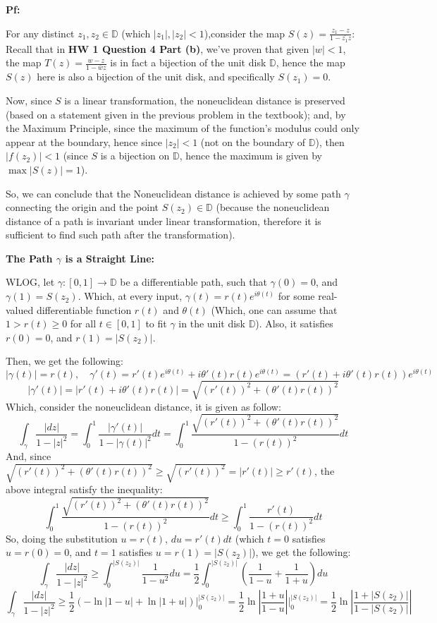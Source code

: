 \documentclass{article}
\begin{document}
\textbf{Pf:}

For any distinct $z_1,z_2\in\mathbb{D}$ (which $|z_1|,|z_2|<1$),consider the map $S(z)=\frac{z_1-z}{1-\bar{z_1}z}$:
Recall that in \textbf{HW 1 Question 4 Part (b)}, we've proven that given $|w|<1$, the map $T(z)=\frac{w-z}{1-\bar{w}z}$ is in fact a bijection of the unit disk $\mathbb{D}$,
hence the map $S(z)$ here is also a bijection of the unit disk, and specifically $S(z_1)=0$.

\hfill

Now, since $S$ is a linear transformation, the noneuclidean distance is preserved (based on a statement given in the previous problem in the textbook);
and, by the Maximum Principle, since the maximum of the function's modulus could only appear at the boundary, hence since $|z_2|<1$ (not on the boundary of $\mathbb{D}$),
then $|f(z_2)|<1$ (since $S$ is a bijection on $\mathbb{D}$, hence the maximum is given by $\max|S(z)|=1$).

So, we can conclude that the Noneuclidean distance is achieved by some path $\gamma$ connecting the origin and the point $S(z_2)\in\mathbb{D}$ (because the noneuclidean distance of a path is invariant under linear transformation, 
therefore it is sufficient to find such path after the transformation).

\hfill

\textbf{The Path $\gamma$ is a Straight Line:}

WLOG, let $\gamma:[0,1]\rightarrow\mathbb{D}$ be a differentiable path, such that $\gamma(0)=0$, and $\gamma(1)=S(z_2)$. 
Which, at every input, $\gamma(t)=r(t)e^{i\theta(t)}$ for some real-valued differentiable function $r(t)$ and $\theta(t)$ (Which, one can assume that $1>r(t)\geq 0$ for all $t\in [0,1]$ to fit $\gamma$ in the unit disk $\mathbb{D}$).
Also, it satisfies $r(0)=0$, and $r(1)=|S(z_2)|$.

Then, we get the following:
$$|\gamma(t)| = r(t),\quad \gamma'(t) = r'(t)e^{i\theta(t)}  + i\theta'(t)r(t)e^{i\theta(t)}=(r'(t)+i\theta'(t)r(t))e^{i\theta(t)}$$
$$|\gamma'(t)| = |r'(t)+i\theta'(t)r(t)| = \sqrt{(r'(t))^2+(\theta'(t)r(t))^2}$$
Which, consider the noneuclidean distance, it is given as follow:
$$\int_{\gamma}\frac{|dz|}{1-|z|^2} = \int_{0}^{1}\frac{|\gamma'(t)|}{1-|\gamma(t)|^2}dt = \int_{0}^{1}\frac{\sqrt{(r'(t))^2+(\theta'(t)r(t))^2}}{1-(r(t))^2}dt$$
And, since $\sqrt{(r'(t))^2+(\theta'(t)r(t))^2}\geq \sqrt{(r'(t))^2} = |r'(t)|\geq r'(t)$, the above integral satisfy the inequality:
$$\int_{0}^{1}\frac{\sqrt{(r'(t))^2+(\theta'(t)r(t))^2}}{1-(r(t))^2}dt \geq \int_{0}^{1}\frac{r'(t)}{1-(r(t))^2}dt$$
So, doing the substitution $u=r(t)$, $du = r'(t)dt$ (which $t=0$ satisfies $u=r(0)=0$, and $t=1$ satisfies $u=r(1)=|S(z_2)|$), we get the following:
$$\int_{\gamma}\frac{|dz|}{1-|z|^2}\geq \int_{0}^{|S(z_2)|}\frac{1}{1-u^2}du = \frac{1}{2}\int_{0}^{|S(z_2)|}\left(\frac{1}{1-u}+\frac{1}{1+u}\right)du$$
$$\int_{\gamma}\frac{|dz|}{1-|z|^2}\geq \frac{1}{2}\left(-\ln|1-u|+\ln|1+u|\right)\bigg |_{0}^{|S(z_2)|} = \frac{1}{2}\ln\left|\frac{1+u}{1-u}\right|\bigg |_{0}^{|S(z_2)|} = \frac{1}{2}\ln\left|\frac{1+|S(z_2)|}{1-|S(z_2)|}\right|$$
\end{document}
